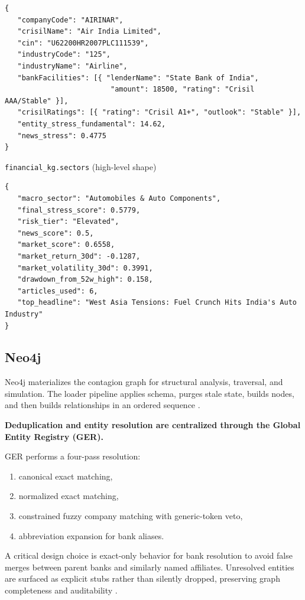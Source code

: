 \begin{lstlisting}[style=json]
{
   "companyCode": "AIRINAR",
   "crisilName": "Air India Limited",
   "cin": "U62200HR2007PLC111539",
   "industryCode": "125",
   "industryName": "Airline",
   "bankFacilities": [{ "lenderName": "State Bank of India",
                         "amount": 18500, "rating": "Crisil AAA/Stable" }],
   "crisilRatings": [{ "rating": "Crisil A1+", "outlook": "Stable" }],
   "entity_stress_fundamental": 14.62,
   "news_stress": 0.4775
}
\end{lstlisting}

\texttt{financial\_kg.sectors} (high-level shape)

\begin{lstlisting}[style=json]
{
   "macro_sector": "Automobiles & Auto Components",
   "final_stress_score": 0.5779,
   "risk_tier": "Elevated",
   "news_score": 0.5,
   "market_score": 0.6558,
   "market_return_30d": -0.1287,
   "market_volatility_30d": 0.3991,
   "drawdown_from_52w_high": 0.158,
   "articles_used": 6,
   "top_headline": "West Asia Tensions: Fuel Crunch Hits India's Auto Industry"
}
\end{lstlisting}

\subsection{Neo4j}

Neo4j materializes the contagion graph for structural analysis, traversal, and simulation. The loader pipeline applies schema, purges stale state, builds nodes, and then builds relationships in an ordered sequence \cite{ref14}.

\textbf{Deduplication and entity resolution are centralized through the Global Entity Registry (GER).}

GER performs a four-pass resolution:

\begin{enumerate}
  \item canonical exact matching,
  \item normalized exact matching,
  \item constrained fuzzy company matching with generic-token veto,
  \item abbreviation expansion for bank aliases.
\end{enumerate}

A critical design choice is exact-only behavior for bank resolution to avoid false merges between parent banks and similarly named affiliates. Unresolved entities are surfaced as explicit stubs rather than silently dropped, preserving graph completeness and auditability \cite{ref22}.

